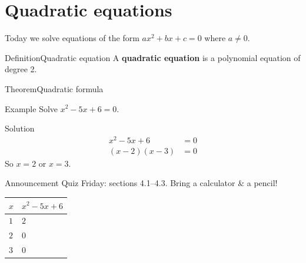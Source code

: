 \documentclass[11pt]{article}
\title{#1}\author{#2}\date{}%
\begin{document}

\section*{Quadratic equations}

Today we solve equations of the form \(ax^{2} + bx + c = 0\) where \(a \neq 0\).

\begin{cldefinition}{Definition}{Quadratic equation}
A \textbf{quadratic equation} is a polynomial equation of degree 2.

\end{cldefinition}

\begin{cltheorem}{Theorem}{Quadratic formula}
\end{cltheorem}

\begin{clexample}{Example}{}
Solve \(x^{2} - 5x + 6 = 0\).

\begin{clsolution}{Solution}
\begin{align*}
x^{2} - 5x + 6 &= 0 \\
(x - 2)(x - 3) &= 0
\end{align*}
So \(x = 2\) or \(x = 3\).

\end{clsolution}
\end{clexample}

\begin{clannouncement}{Announcement}{}
Quiz Friday: sections 4.1–4.3. Bring a calculator \& a pencil!

\end{clannouncement}

\begin{center}
\begin{tabular}{ll}
\toprule
\(x\) & \(x^{2} - 5x + 6\) \\
\midrule
\(1\) & \(2\) \\
\(2\) & \(0\) \\
\(3\) & \(0\) \\
\bottomrule
\end{tabular}
\end{center}
\end{document}
